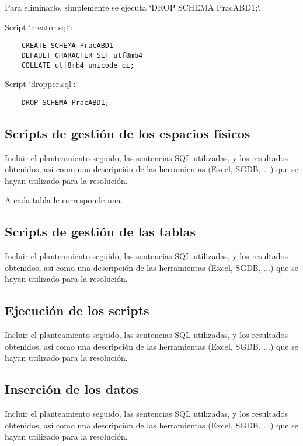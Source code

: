 \documentclass[a4paper, 11pt, oneside]{article} %
\begin{document}
Para eliminarlo, simplemente se ejecuta `DROP SCHEMA PracABD1;`.

Script `creator.sql`:

\begin{verbatim}
	CREATE SCHEMA PracABD1
	DEFAULT CHARACTER SET utf8mb4
	COLLATE utf8mb4_unicode_ci;
\end{verbatim}

Script `dropper.sql`:

\begin{verbatim}
	DROP SCHEMA PracABD1;
\end{verbatim}

\subsection{Scripts de gestión de los espacios físicos}

Incluir el planteamiento seguido, las sentencias SQL utilizadas, y los resultados obtenidos, así como una descripción de las herramientas (Excel, SGDB, ...) que se hayan utilizado para la resolución.

A cada tabla le corresponde una

\subsection{Scripts de gestión de las tablas}

Incluir el planteamiento seguido, las sentencias SQL utilizadas, y los resultados obtenidos, así como una descripción de las herramientas (Excel, SGDB, ...) que se hayan utilizado para la resolución.

\subsection{Ejecución de los scripts}

Incluir el planteamiento seguido, las sentencias SQL utilizadas, y los resultados obtenidos, así como una descripción de las herramientas (Excel, SGDB, ...) que se hayan utilizado para la resolución.

\subsection{Inserción de los datos}

Incluir el planteamiento seguido, las sentencias SQL utilizadas, y los resultados obtenidos, así como una descripción de las herramientas (Excel, SGDB, ...) que se hayan utilizado para la resolución.
\end{document}
